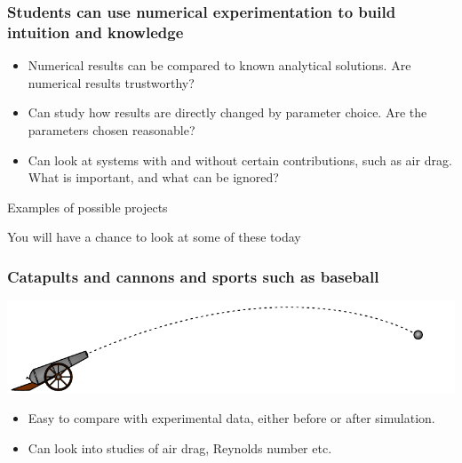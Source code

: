 \documentclass[english, 12pt]{beamer}
\begin{document}
\begin{frame}[fragile]
\frametitle{Students can use numerical experimentation to build intuition and knowledge}

\begin{itemize}
	\item Numerical results can be compared to known analytical solutions. Are numerical results trustworthy?
	\item Can study how results are directly changed by parameter choice. Are the parameters chosen reasonable?
	\item Can look at systems with and without certain contributions, such as air drag. \\ What is important, and what can be ignored?
\end{itemize}
\end{frame}

\begin{frame}
\begin{center}
{\Huge \color{DarkFern} Examples of possible projects}

You will have a chance to look at some of these today
\end{center}
\end{frame}

\begin{frame}[fragile]
\frametitle{Catapults and cannons and sports such as baseball}

\begin{center}
\includegraphics[width=\textwidth]{cannonball}
\end{center}

\vspace{0.5cm}

\begin{itemize}
	\item Easy to compare with experimental data, either before or after simulation.
	\item Can look into studies of air drag, Reynolds number etc.
\end{itemize}
\end{frame}
\end{document}
